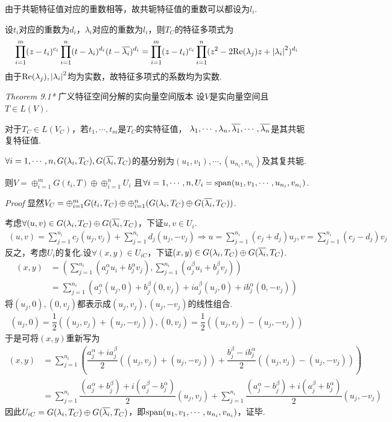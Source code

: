 由于共轭特征值对应的重数相等，故共轭特征值的重数可以都设为\(l_i\).

设\(t_i\)对应的重数为\(d_i\)，\(\lambda_i\)对应的重数为\(l_i\)，则\(T_C\)的特征多项式为
    \begin{align*}
        \prod_{i=1}^m (z-t_i)^{c_i} \prod_{i=1}^n (t-\lambda_i)^{d_i}(t-\overline{\lambda_i})^{d_i}
        =\prod_{i=1}^m (z-t_i)^{c_i} \prod_{i=1}^n (z^2-2\mathrm{Re}(\lambda_j)z+\left\lvert \lambda_i \right\rvert^2)^{d_i}
    \end{align*}
由于\(\mathrm{Re}(\lambda_j),\left\lvert \lambda_i \right\rvert^2\)均为实数，故特征多项式的系数均为实数.

\newpage

\textit{Theorem 9.1*} {\kaishu 广义特征空间分解的实向量空间版本}
设\(V\)是实向量空间且\(T \in L(V)\).

对于\(T_C \in L(V_C)\)，若\(t_1,\cdots,t_m\)是\(T_C\)的实特征值，
\(\lambda_1,\cdots,\lambda_n,\overline{\lambda_1},\cdots,\overline{\lambda_n}\)是其共轭复特征值.

\(\forall i=1,\cdots,n,G(\lambda_i,T_C),G(\overline{\lambda_i},T_C)\)的基分别为\((u_1,v_1),\cdots,(u_{n_i},v_{n_i})\)及其复共轭.

则\(V=\oplus_{i=1}^m G(t_i,T) \oplus \oplus_{i=1}^n U_i\)
且\(\forall i=1,\cdots,n,U_i=\mathrm{span}(u_1,v_1,\cdots,u_{n_i},v_{n_i})\).

\textit{Proof}
显然\(V_C=\oplus_{i=1}^m G(t_i,T_C) \oplus \oplus_{i=1}^n (G(\lambda_i,T_C) \oplus G(\overline{\lambda_i},T_C))\).

考虑\(\forall (u,v) \in G(\lambda_i,T_C) \oplus G(\overline{\lambda_i},T_C)\)，下证\(u,v \in U_i\).
    \begin{align*}
        (u,v)=\sum_{j=1}^{n_i} c_j(u_j,v_j)+\sum_{j=1}^{n_i} d_j(u_j,-v_j) \Rightarrow
        u=\sum_{j=1}^{n_i} (c_j+d_j)u_j,v=\sum_{j=1}^{n_i} (c_j-d_j)v_j
    \end{align*}
反之，考虑\(U_i\)的复化.设\(\forall (x,y) \in U_{iC}\)，下证\((x,y) \in G(\lambda_i,T_C) \oplus G(\overline{\lambda_i},T_C)\).
    \begin{align*}
        (x,y)&=(\sum_{j=1}^{n_i}(a_j^\alpha u_i+b_j^\alpha v_j),\sum_{j=1}^{n_i}(a_j^\beta u_i+b_j^\beta v_j)) \\
             &=\sum_{j=1}^{n_i}(a_j^\alpha (u_j,0)+b_j^\beta (0,v_j)+i a_j^\beta (u_j,0)+i b_j^\alpha (0,-v_j))
    \end{align*}
将\((u_j,0),(0,v_j)\)都表示成\((u_j,v_j),(u_j,-v_j)\)的线性组合.
    \begin{align*}
        (u_j,0)=\dfrac{1}{2}((u_j,v_j)+(u_j,-v_j)),(0,v_j)=\dfrac{1}{2}((u_j,v_j)-(u_j,-v_j))
    \end{align*}
于是可将\((x,y)\)重新写为
    \begin{align*}
        (x,y)&=\sum_{j=1}^{n_i}(\dfrac{a_j^\alpha+i a_j^\beta}{2}((u_j,v_j)+(u_j,-v_j))+
        \dfrac{b_j^\beta-i b_j^\alpha}{2}((u_j,v_j)-(u_j,-v_j))) \\
        &=\sum_{j=1}^{n_i} \dfrac{(a_j^\alpha+b_j^\beta)+i(a_j^\beta-b_j^\alpha)}{2}(u_j,v_j)+
        \sum_{j=1}^{n_i} \dfrac{(a_j^\alpha-b_j^\beta)+i(a_j^\beta+b_j^\alpha)}{2}(u_j,-v_j)
    \end{align*}
因此\(U_{iC}=G(\lambda_i,T_C) \oplus G(\overline{\lambda_i},T_C)\)，即\(\mathrm{span}(u_1,v_1,\cdots,u_{n_i},v_{n_i})\)，证毕.


